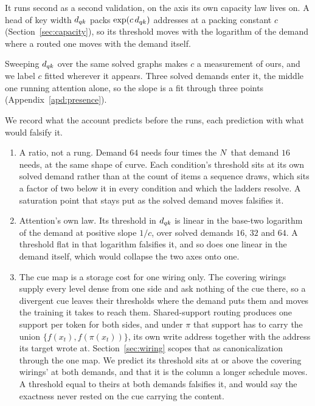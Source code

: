 It runs second as a second validation, on the axis its own capacity law lives on. A head of key width $d_{qk}$ packs $\exp(c\,d_{qk})$ addresses at a packing constant $c$ (Section~\ref{sec:capacity}), so its threshold moves with the logarithm of the demand where a routed one moves with the demand itself.

Sweeping $d_{qk}$ over the same solved graphs makes $c$ a measurement of ours, and we label $c$ fitted wherever it appears. Three solved demands enter it, the middle one running attention alone, so the slope is a fit through three points (Appendix~\ref{apd:presence}).

We record what the account predicts before the runs, each prediction with what would falsify it.
\begin{enumerate}\setlength{\itemsep}{1pt}\setlength{\parskip}{0pt}

\item A ratio, not a rung. Demand $64$ needs four times the $N$ that demand $16$ needs, at the same shape of curve. Each condition's threshold sits at its own solved demand rather than at the count of items a sequence draws, which sits a factor of two below it in every condition and which the ladders resolve. A saturation point that stays put as the solved demand moves falsifies it.

\item Attention's own law. Its threshold in $d_{qk}$ is linear in the base-two logarithm of the demand at positive slope $1/c$, over solved demands $16$, $32$ and $64$. A threshold flat in that logarithm falsifies it, and so does one linear in the demand itself, which would collapse the two axes onto one.

\item The cue map is a storage cost for one wiring only. The covering wirings supply every level dense from one side and ask nothing of the cue there, so a divergent cue leaves their thresholds where the demand puts them and moves the training it takes to reach them. Shared-support routing produces one support per token for both sides, and under $\pi$ that support has to carry the union $\{f(x_t), f(\pi(x_t))\}$, its own write address together with the address its target wrote at. Section~\ref{sec:wiring} scopes that as canonicalization through the one map. We predict its threshold sits at or above the covering wirings' at both demands, and that it is the column a longer schedule moves. A threshold equal to theirs at both demands falsifies it, and would say the exactness never rested on the cue carrying the content.
\end{enumerate}

